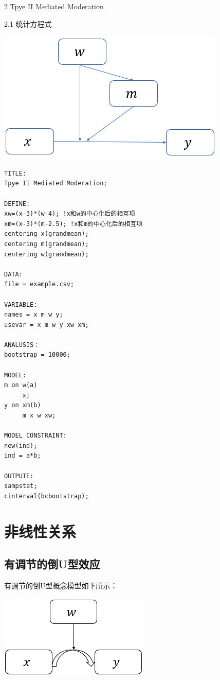 \documentclass[
]{book}
\begin{document}
2 Tpye II Mediated Moderation

2.1 统计方程式

\includegraphics{figs/1152.png}

\begin{verbatim}
TITLE:
Tpye II Mediated Moderation;

DEFINE:
xw=(x-3)*(w-4); !x和w的中心化后的相互项 
xm=(x-3)*(m-2.5); !x和m的中心化后的相互项 
centering x(grandmean); 
centering m(grandmean); 
centering w(grandmean); 

DATA:
file = example.csv;

VARIABLE:
names = x m w y;
usevar = x m w y xw xm;

ANALUSIS：
bootstrap = 10000;

MODEL:
m on w(a)
     x;
y on xm(b)
     m x w xw;

MODEL CONSTRAINT:
new(ind);
ind = a*b;

OUTPUTE:
sampstat;
cinterval(bcbootstrap);
\end{verbatim}

\hypertarget{nonlinear}{%
\section{非线性关系}\label{nonlinear}}

\hypertarget{ux6709ux8c03ux8282ux7684ux5012uux578bux6548ux5e94}{%
\subsection{有调节的倒U型效应}\label{ux6709ux8c03ux8282ux7684ux5012uux578bux6548ux5e94}}

有调节的倒U型概念模型如下所示：

\includegraphics{figs/1121.png}
\end{document}
